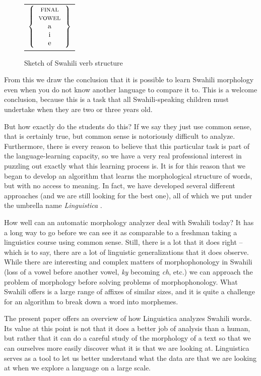 \documentclass[output=paper,colorlinks,citecolor=brown]{langscibook}
\begin{document}
\begin{figure}
\begin{sideways}
\begin{tabular}{l}
$\left\{ \begin{tabular}{c} \textsc{final}\\ \textsc{vowel}\\a\\i\\e  \end{tabular}  \right\}$

\end{tabular}
\end{sideways}
\caption{Sketch of Swahili verb structure}
\label{sketch1}
\end{figure}
 
From this we draw the conclusion that it is possible to learn Swahili morphology even when you do not know another language to compare it to. This is a welcome conclusion, because this is a task that all Swahili-speaking children must undertake when they are two or three years old. 

But how exactly do the students do this? If we say they just use common sense, that is certainly true, but common sense is notoriously difficult to analyze. Furthermore, there is every reason to believe that this particular task is part of the language-learning capacity, so we have a very real professional interest in puzzling out exactly what this learning process is. It is for this reason that we began to develop an algorithm that learns the morphological structure of words, but with no access to meaning. In fact, we have developed several different approaches (and we are still looking for the best one), all of which we put under the umbrella name \textit{Linguistica} \citep{Goldsmith2001,Goldsmith2006,Goldsmith2010}.

How well can an automatic morphology analyzer deal with Swahili today? It has a long way to go before we can see it as comparable to a freshman taking a linguistics course using common sense. Still, there is a lot that it does right -- which is to say, there are a lot of linguistic generalizations that it does observe. While there are interesting and complex matters of morphophonology in Swahili (loss of a vowel before another vowel, \textit{ky} becoming \textit{ch}, etc.) we can approach the problem of morphology before solving problems of morphophonology. What Swahili offers is a large range of affixes of similar sizes, and it is quite a challenge for an algorithm to break down a word into morphemes.

The present paper offers an overview of how Linguistica analyzes Swahili words. Its value at this point is not that it does a better job of analysis than a human, but rather that it can do a careful study of the morphology of a text so that we can ourselves more easily discover what it is that we are looking at. Linguistica serves as a tool to let us better understand what the data are that we are looking at when we explore a language on a large scale.\largerpage
\end{document}
